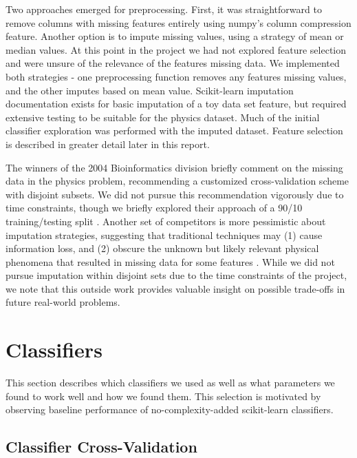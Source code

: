 \documentclass{article}
\begin{document}
Two approaches emerged for preprocessing.
First, it was straightforward to remove columns with missing features entirely using numpy's column compression feature.
Another option is to impute missing values, using a strategy of mean or median values.
At this point in the project we had not explored feature selection and were unsure of the relevance of the features missing data.
We implemented both strategies - one preprocessing function removes any features missing values, and the other imputes based on mean value.
Scikit-learn imputation documentation exists for basic imputation of a toy data set feature, but required extensive testing to be suitable for the physics dataset.
Much of the initial classifier exploration was performed with the imputed dataset.
Feature selection is described in greater detail later in this report.

The winners of the 2004 Bioinformatics division briefly comment on the missing data in the physics problem, recommending a customized cross-validation scheme with disjoint subsets. 
We did not pursue this recommendation vigorously due to time constraints, though we briefly explored their approach of a 90/10 training/testing split \cite{pfahringer2004weka}.
Another set of competitors is more pessimistic about imputation strategies, suggesting that traditional techniques may (1) cause information loss, and (2) obscure the unknown but likely relevant physical phenomena that resulted in missing data for some features \cite{vogel2004anti}.
While we did not pursue imputation within disjoint sets due to the time constraints of the project, we note that this outside work provides valuable insight on possible trade-offs in future real-world problems.


\section{Classifiers}

This section describes which classifiers we used as well as what parameters we found to work well and how we found them. 
This selection is motivated by observing baseline performance of no-complexity-added scikit-learn classifiers.

\subsection{Classifier Cross-Validation}
\end{document}
